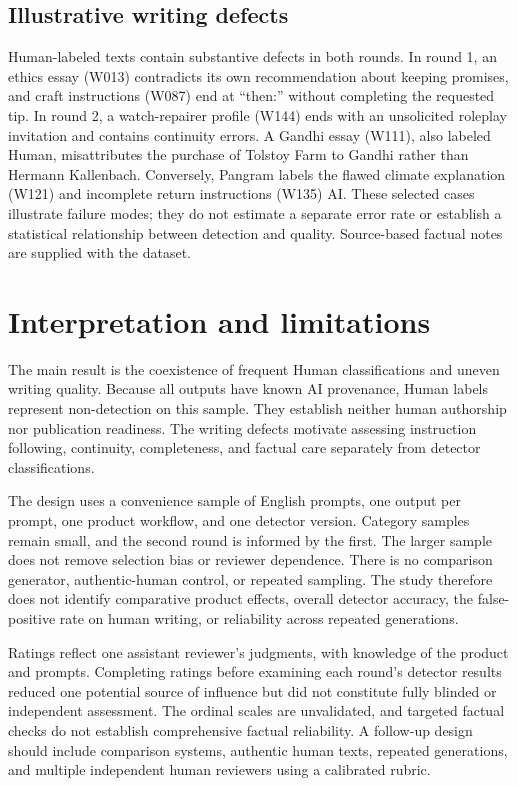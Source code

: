 \documentclass[11pt]{article}
\begin{document}
\subsection{Illustrative writing defects}
Human-labeled texts contain substantive defects in both rounds. In round 1, an ethics essay (W013) contradicts its own recommendation about keeping promises, and craft instructions (W087) end at ``then:'' without completing the requested tip. In round 2, a watch-repairer profile (W144) ends with an unsolicited roleplay invitation and contains continuity errors. A Gandhi essay (W111), also labeled Human, misattributes the purchase of Tolstoy Farm to Gandhi rather than Hermann Kallenbach. Conversely, Pangram labels the flawed climate explanation (W121) and incomplete return instructions (W135) AI. These selected cases illustrate failure modes; they do not estimate a separate error rate or establish a statistical relationship between detection and quality. Source-based factual notes are supplied with the dataset.

\section{Interpretation and limitations}
The main result is the coexistence of frequent Human classifications and uneven writing quality. Because all outputs have known AI provenance, Human labels represent non-detection on this sample. They establish neither human authorship nor publication readiness. The writing defects motivate assessing instruction following, continuity, completeness, and factual care separately from detector classifications.

The design uses a convenience sample of English prompts, one output per prompt, one product workflow, and one detector version. Category samples remain small, and the second round is informed by the first. The larger sample does not remove selection bias or reviewer dependence. There is no comparison generator, authentic-human control, or repeated sampling. The study therefore does not identify comparative product effects, overall detector accuracy, the false-positive rate on human writing, or reliability across repeated generations.

Ratings reflect one assistant reviewer's judgments, with knowledge of the product and prompts. Completing ratings before examining each round's detector results reduced one potential source of influence but did not constitute fully blinded or independent assessment. The ordinal scales are unvalidated, and targeted factual checks do not establish comprehensive factual reliability. A follow-up design should include comparison systems, authentic human texts, repeated generations, and multiple independent human reviewers using a calibrated rubric.
\end{document}
